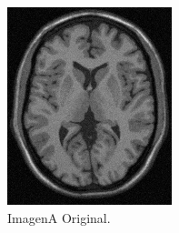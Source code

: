 \documentclass[11pt,twocolumn,twoside]{opticajnl}
\begin{document}
\begin{figure}[h]
    \centering
         \begin{subfigure}[h]{0.32\linewidth}
            \centering
            \includegraphics[width=\textwidth]{Figuras/ImagenA.png}
            \caption{ImagenA Original.} 
         \end{subfigure}
         \begin{subfigure}[h]{0.32\linewidth}
            \centering

\end{subfigure}
\end{figure}
\end{document}
